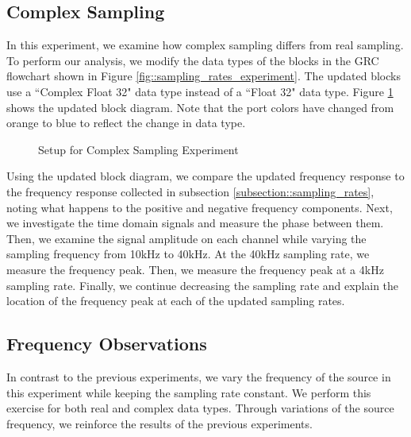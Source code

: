 \documentclass{article}
\begin{document}
\subsection{Complex Sampling \label{subsection::complex_sampling}}

In this experiment, we examine how complex sampling differs from real sampling. To perform our analysis, we modify the data types of the blocks in the GRC flowchart shown in Figure \ref{fig::sampling_rates_experiment}. The updated blocks use a ``Complex Float 32" data type instead of a ``Float 32" data type. Figure \ref{fig::complex_sampling_experiment} shows the updated block diagram. Note that the port colors have changed from orange to blue to reflect the change in data type.

\begin{figure}[H]
	\centerline{}
	\caption{Setup for Complex Sampling Experiment}
	\label{fig::complex_sampling_experiment}
\end{figure}

Using the updated block diagram, we compare the updated frequency response to the frequency response collected in subsection \ref{subsection::sampling_rates}, noting what happens to the positive and negative frequency components. Next, we investigate the time domain signals and measure the phase between them. Then, we examine the signal amplitude on each channel while varying the sampling frequency from 10kHz to 40kHz. At the 40kHz sampling rate, we measure the frequency peak. Then, we measure the frequency peak at a 4kHz sampling rate. Finally, we continue decreasing the sampling rate and explain the location of the frequency peak at each of the updated sampling rates.

\subsection{Frequency Observations}

In contrast to the previous experiments, we vary the frequency of the source in this experiment while keeping the sampling rate constant. We perform this exercise for both real and complex data types. Through variations of the source frequency, we reinforce the results of the previous experiments.
\end{document}
